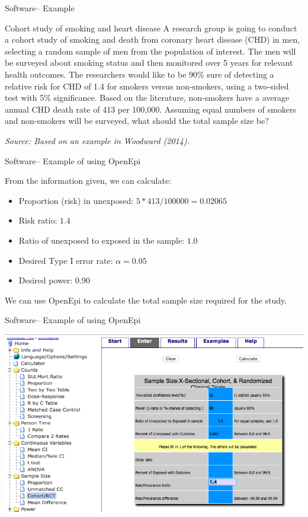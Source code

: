 \documentclass[ignorenonframetext,]{beamer}
\providecommand{\tightlist}{%
  \setlength{\itemsep}{0pt}\setlength{\parskip}{0pt}}
\begin{document}
\begin{frame}{Software-- Example}

\begin{block}{Cohort study of smoking and heart disease}
A research group is going to conduct a cohort study of smoking and death from coronary heart disease (CHD) in men, selecting a random sample of men from the population of interest. The men will be surveyed about smoking status and then monitored over 5 years for relevant health outcomes. The researchers would like to be 90\% sure of detecting a relative risk for CHD of 1.4 for smokers versus non-smokers, using a two-sided test with 5\% significance. Based on the literature, non-smokers have a average annual CHD death rate of 413 per 100,000. Assuming equal numbers of smokers and non-smokers will be surveyed, what should the total sample size be?
\end{block}

\footnotesize{\textit{Source: Based on an example in Woodward (2014).}}

\end{frame}

\begin{frame}{Software-- Example of using OpenEpi}

From the information given, we can calculate:

\begin{itemize}
\tightlist
\item
  Proportion (risk) in unexposed: \(5 * 413 / 100000 = 0.02065\)
\item
  Risk ratio: \(1.4\)
\item
  Ratio of unexposed to exposed in the sample: \(1.0\)
\item
  Desired Type I error rate: \(\alpha = 0.05\)
\item
  Desired power: \(0.90\)
\end{itemize}

We can use OpenEpi to calculate the total sample size required for the
study.

\end{frame}

\begin{frame}{Software-- Example of using OpenEpi}

\begin{center}\includegraphics[width=\textwidth]{images/open_epi_example} \end{center}

\end{frame}
\end{document}

